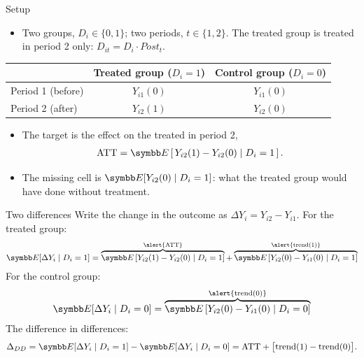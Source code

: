 \documentclass[aspectratio=169,11pt]{beamer}
\begin{document}
\begin{frame}{Setup}
\begin{itemize}
	\item Two groups, $D_i \in \{0, 1\}$; two periods, $t \in \{1, 2\}$. The treated group is treated in period 2 only:
	$D_{it} = D_i \cdot Post_t$.
\end{itemize}
\begin{center}
\begin{tabular}{lcc}
\toprule
 & Treated group ($D_i = 1$) & Control group ($D_i = 0$) \\
\midrule
Period 1 (before) & $Y_{i1}(0)$ & $Y_{i1}(0)$ \\
Period 2 (after) & $Y_{i2}(1)$ & $Y_{i2}(0)$ \\
\bottomrule
\end{tabular}
\end{center}
\begin{itemize}
	\item The target is the effect on the treated in period 2,
	\begin{align*}
		\text{ATT} = \E\left[\,Y_{i2}(1) - Y_{i2}(0) \mid D_i = 1\,\right].
	\end{align*}
	\item The missing cell is $\E[Y_{i2}(0) \mid D_i = 1]$: what the treated group would have done
	without treatment.
\end{itemize}
\end{frame}


\begin{frame}{Two differences}
\small
Write the change in the outcome as $\Delta Y_i = Y_{i2} - Y_{i1}$. For the treated group:
\begin{align*}
	\E[\Delta Y_i \mid D_i=1] = \overbrace{\E\left[Y_{i2}(1) - Y_{i2}(0) \mid D_i=1 \right]}^{\alert{\text{ATT}}}
	+ \overbrace{\E\left[Y_{i2}(0) - Y_{i1}(0) \mid D_i=1 \right]}^{\alert{\text{trend}(1)}}
\end{align*}
For the control group:
\begin{align*}
	\E[\Delta Y_i \mid D_i=0] = \overbrace{\E\left[Y_{i2}(0) - Y_{i1}(0) \mid D_i=0 \right]}^{\alert{\text{trend}(0)}}
\end{align*}
The difference in differences:
\begin{align*}
	\Delta_{DD} = \E[\Delta Y_i \mid D_i=1] - \E[\Delta Y_i \mid D_i=0]
	= \text{ATT} + \big[\text{trend}(1) - \text{trend}(0)\big].
\end{align*}
\end{frame}
\end{document}
